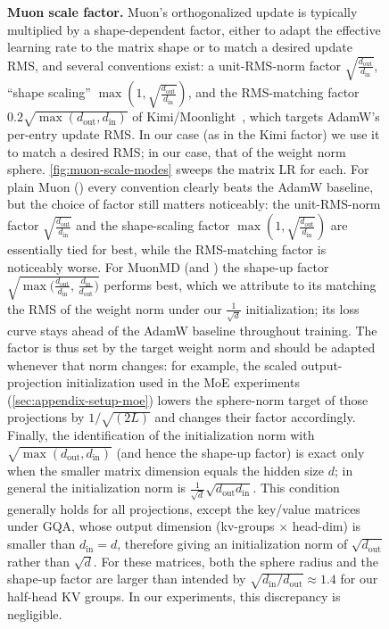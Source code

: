 \documentclass[10pt]{article} %
\newcommand{\dout}{d_{\text{out}}}
\newcommand{\din}{d_{\text{in}}}
\begin{document}
\begin{figure}[t]
\textbf{Muon scale factor.} Muon's orthogonalized update is typically multiplied by a shape-dependent factor, either to adapt the effective learning rate to the matrix shape or to match a desired update RMS, and several conventions exist: a unit-RMS-norm factor $\sqrt{\frac{\dout}{\din}}$, ``shape scaling'' $\max(1,\sqrt{\frac{\dout}{\din}})$, and the RMS-matching factor $0.2\sqrt{\max(\dout,\din)}$ of Kimi/Moonlight~\citep{liu2025muonscalable}, which targets AdamW's per-entry update RMS. In our case (as in the Kimi factor) we use it to match a desired RMS; in our case, that of the weight norm sphere. \autoref{fig:muon-scale-modes} sweeps the matrix LR for each. For plain Muon (\panelleft) every convention clearly beats the AdamW baseline, but the choice of factor still matters noticeably: the unit-RMS-norm factor $\sqrt{\frac{\dout}{\din}}$ and the shape-scaling factor $\max(1,\sqrt{\frac{\dout}{\din}})$ are essentially tied for best, while the RMS-matching factor is noticeably worse. For MuonMD (\panelcenter and \panelright) the shape-up factor $\sqrt{\max\!\big(\frac{\dout}{\din},\, \frac{\din}{\dout}\big)}$ performs best, which we attribute to its matching the RMS of the weight norm under our $\frac{1}{\sqrt{d}}$ initialization; its loss curve stays ahead of the AdamW baseline throughout training. The factor is thus set by the target weight norm and should be adapted whenever that norm changes: for example, the scaled output-projection initialization used in the MoE experiments (\autoref{sec:appendix-setup-moe}) lowers the sphere-norm target of those projections by ${1}/{\sqrt{(2L)}}$ and changes their factor accordingly. Finally, the identification of the initialization norm with $\sqrt{\max(\dout,\din)}$ (and hence the shape-up factor) is exact only when the smaller matrix dimension equals the hidden size $d$; in general the initialization norm is $\frac{1}{\sqrt d}\sqrt{\dout\din}$. This condition generally holds for all projections, except the key/value matrices under GQA, whose output dimension (kv-groups $\times$ head-dim) is smaller than $\din=d$, therefore giving an initialization norm of $\sqrt{\dout}$ rather than $\sqrt{d}$. For these matrices, both the sphere radius and the shape-up factor are larger than intended by $\sqrt{\din/\dout}\approx1.4$ for our half-head KV groups. In our experiments, this discrepancy is negligible.


\end{figure}
\end{document}
